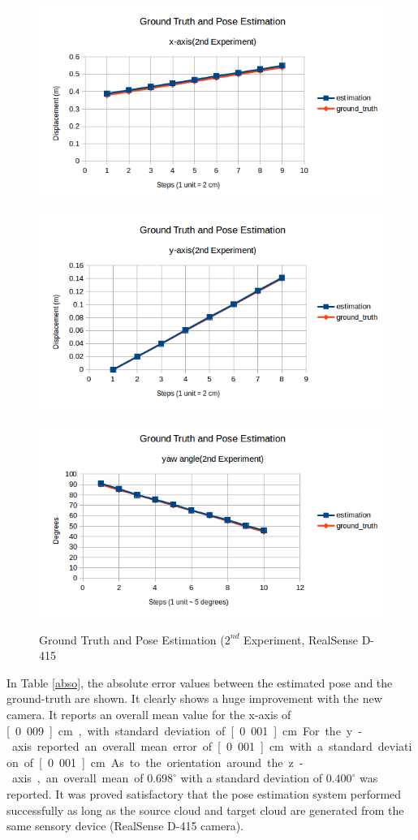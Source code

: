 \begin{figure}[htp]
\begin{center}
{
  \includegraphics[clip,width=0.7\columnwidth]{figures/x_newrealsense.png}
}
\end{center}
\begin{center}
{
  \includegraphics[clip,width=0.7\columnwidth]{figures/y_newrealsense.png}
}
\end{center}

\begin{center}
{
  \includegraphics[clip,width=0.7\columnwidth]{figures/yaw_newrealsense.png}
}
\end{center}
\caption{Ground Truth and Pose Estimation ($2^{nd}$ Experiment, RealSense D-415}
\label{newreal22}
\end{figure}

In Table \ref{abso}, the absolute error values between the estimated pose and the ground-truth are shown. It clearly shows a huge improvement with the new camera. It reports an overall mean value for the x-axis of \unit[0.009] {cm},  with standard deviation of \unit[0.001] {cm}. For the y-axis reported an overall mean error of \unit[0.001] {cm} with a standard deviation of \unit[0.001] {cm}. As to the orientation around the z-axis, an overall mean of $0.698^{\circ}$ with a standard deviation of $0.400^{\circ}$ was reported. It was proved satisfactory that the pose estimation system performed successfully as long as the source cloud and target cloud are generated from the same sensory device (RealSense D-415 camera). 

